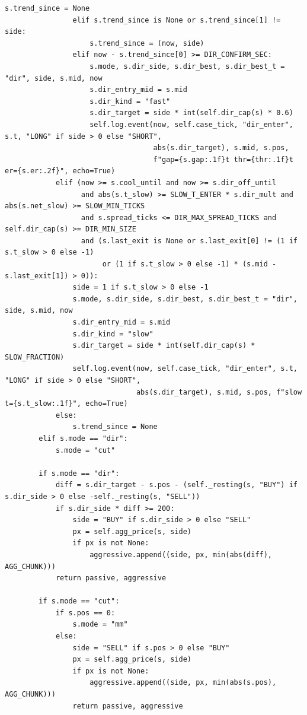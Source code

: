 \begin{lstlisting}[style=algocode]
                    s.trend_since = None
                elif s.trend_since is None or s.trend_since[1] != side:
                    s.trend_since = (now, side)
                elif now - s.trend_since[0] >= DIR_CONFIRM_SEC:
                    s.mode, s.dir_side, s.dir_best, s.dir_best_t = "dir", side, s.mid, now
                    s.dir_entry_mid = s.mid
                    s.dir_kind = "fast"
                    s.dir_target = side * int(self.dir_cap(s) * 0.6)
                    self.log.event(now, self.case_tick, "dir_enter", s.t, "LONG" if side > 0 else "SHORT",
                                   abs(s.dir_target), s.mid, s.pos,
                                   f"gap={s.gap:.1f}t thr={thr:.1f}t er={s.er:.2f}", echo=True)
            elif (now >= s.cool_until and now >= s.dir_off_until
                  and abs(s.t_slow) >= SLOW_T_ENTER * s.dir_mult and abs(s.net_slow) >= SLOW_MIN_TICKS
                  and s.spread_ticks <= DIR_MAX_SPREAD_TICKS and self.dir_cap(s) >= DIR_MIN_SIZE
                  and (s.last_exit is None or s.last_exit[0] != (1 if s.t_slow > 0 else -1)
                       or (1 if s.t_slow > 0 else -1) * (s.mid - s.last_exit[1]) > 0)):
                side = 1 if s.t_slow > 0 else -1
                s.mode, s.dir_side, s.dir_best, s.dir_best_t = "dir", side, s.mid, now
                s.dir_entry_mid = s.mid
                s.dir_kind = "slow"
                s.dir_target = side * int(self.dir_cap(s) * SLOW_FRACTION)
                self.log.event(now, self.case_tick, "dir_enter", s.t, "LONG" if side > 0 else "SHORT",
                               abs(s.dir_target), s.mid, s.pos, f"slow t={s.t_slow:.1f}", echo=True)
            else:
                s.trend_since = None
        elif s.mode == "dir":
            s.mode = "cut"

        if s.mode == "dir":
            diff = s.dir_target - s.pos - (self._resting(s, "BUY") if s.dir_side > 0 else -self._resting(s, "SELL"))
            if s.dir_side * diff >= 200:
                side = "BUY" if s.dir_side > 0 else "SELL"
                px = self.agg_price(s, side)
                if px is not None:
                    aggressive.append((side, px, min(abs(diff), AGG_CHUNK)))
            return passive, aggressive

        if s.mode == "cut":
            if s.pos == 0:
                s.mode = "mm"
            else:
                side = "SELL" if s.pos > 0 else "BUY"
                px = self.agg_price(s, side)
                if px is not None:
                    aggressive.append((side, px, min(abs(s.pos), AGG_CHUNK)))
                return passive, aggressive


\end{lstlisting}
